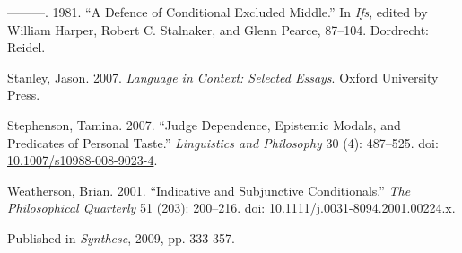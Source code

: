 \documentclass[
  11pt,
  letterpaper,
  DIV=11,
  numbers=noendperiod,
  twoside]{scrartcl}
\newlength{\cslhangindent}
\newenvironment{CSLReferences}[2] %
 {\begin{list}{}{%
  \setlength{\itemindent}{0pt}
  \setlength{\leftmargin}{0pt}
  \setlength{\parsep}{0pt}
  \ifodd #1
   \setlength{\leftmargin}{\cslhangindent}
   \setlength{\itemindent}{-1\cslhangindent}
  \fi
  \setlength{\itemsep}{#2\baselineskip}}}
 {\end{list}}
\begin{document}
\begin{CSLReferences}{1}{0}
---------. 1981. {``A Defence of Conditional Excluded Middle.''} In
\emph{Ifs}, edited by William Harper, Robert C. Stalnaker, and Glenn
Pearce, 87--104. Dordrecht: Reidel.

Stanley, Jason. 2007. \emph{{Language in Context: Selected Essays}}.
Oxford University Press.

Stephenson, Tamina. 2007. {``Judge Dependence, Epistemic Modals, and
Predicates of Personal Taste.''} \emph{Linguistics and Philosophy} 30
(4): 487--525. doi:
\href{https://doi.org/10.1007/s10988-008-9023-4}{10.1007/s10988-008-9023-4}.

Weatherson, Brian. 2001. {``{Indicative and Subjunctive
Conditionals}.''} \emph{The Philosophical Quarterly} 51 (203): 200--216.
doi:
\href{https://doi.org/10.1111/j.0031-8094.2001.00224.x}{10.1111/j.0031-8094.2001.00224.x}.

\end{CSLReferences}



\noindent Published in\emph{
Synthese}, 2009, pp. 333-357.
\end{document}
